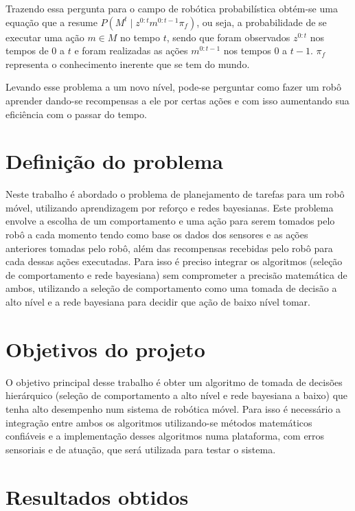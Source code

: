 Trazendo essa pergunta para o campo de robótica probabilística obtém-se uma equação que a resume $ P \left( M^t \mid z^{0: t} m^{0: t -1} \pi_f \right) $, ou seja, a probabilidade de se executar uma ação $ m \in M $ no tempo $ t $, sendo que foram observados $ z^{0:t} $ nos tempos de $ 0 $ a $ t $ e foram realizadas as ações $ m^{0:t-1} $ nos tempos $ 0 $ a $ t-1 $. $ \pi_f $ representa o conhecimento inerente que se tem do mundo.

Levando esse problema a um novo nível, pode-se perguntar como fazer um robô aprender dando-se recompensas a ele por certas ações e com isso aumentando sua eficiência com o passar do tempo.


\section{Definição do problema}

Neste trabalho é abordado o problema de planejamento de tarefas para um robô móvel, utilizando aprendizagem por reforço e redes bayesianas. Este problema envolve a escolha de um comportamento e uma ação para serem tomados pelo robô a cada momento tendo como base os dados dos sensores e as ações anteriores tomadas pelo robô, além das recompensas recebidas pelo robô para cada dessas ações executadas. Para isso é preciso integrar os algoritmos (seleção de comportamento e rede bayesiana) sem comprometer a precisão matemática de ambos, utilizando a seleção de comportamento como uma tomada de decisão a alto nível e a rede bayesiana para decidir que ação de baixo nível tomar.


\section{Objetivos do projeto}

O objetivo principal desse trabalho é obter um algoritmo de tomada de decisões hierárquico (seleção de comportamento a alto nível e rede bayesiana a baixo) que tenha alto desempenho num sistema de robótica móvel. Para isso é necessário a integração entre ambos os algoritmos utilizando-se métodos matemáticos confiáveis e a implementação desses algoritmos numa plataforma, com erros sensoriais e de atuação, que será utilizada para testar o sistema.


\section{Resultados obtidos}

